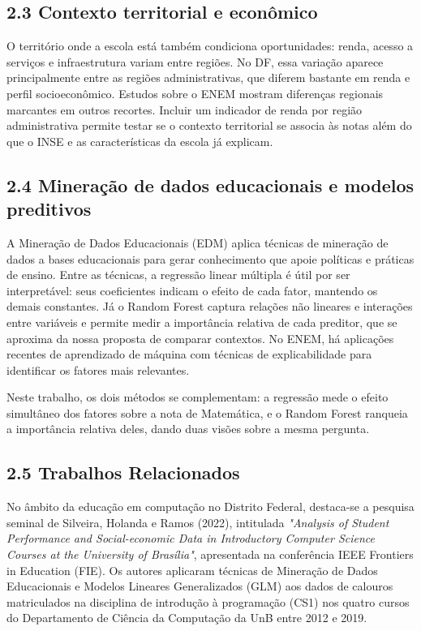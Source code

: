 \documentclass[twocolumn,10pt,a4paper]{article}
\begin{document}
\subsection*{2.3 Contexto territorial e econômico}

O território onde a escola está também condiciona oportunidades: renda, acesso a serviços e infraestrutura variam entre regiões. No DF, essa variação aparece principalmente entre as regiões administrativas, que diferem bastante em renda e perfil socioeconômico. Estudos sobre o ENEM mostram diferenças regionais marcantes em outros recortes. Incluir um indicador de renda por região administrativa permite testar se o contexto territorial se associa às notas além do que o INSE e as características da escola já explicam.

\subsection*{2.4 Mineração de dados educacionais e modelos preditivos}

A Mineração de Dados Educacionais (EDM) aplica técnicas de mineração de dados a bases educacionais para gerar conhecimento que apoie políticas e práticas de ensino. Entre as técnicas, a regressão linear múltipla é útil por ser interpretável: seus coeficientes indicam o efeito de cada fator, mantendo os demais constantes. Já o Random Forest captura relações não lineares e interações entre variáveis e permite medir a importância relativa de cada preditor, que se aproxima da nossa proposta de comparar contextos. No ENEM, há aplicações recentes de aprendizado de máquina com técnicas de explicabilidade para identificar os fatores mais relevantes.

Neste trabalho, os dois métodos se complementam: a regressão mede o efeito simultâneo dos fatores sobre a nota de Matemática, e o Random Forest ranqueia a importância relativa deles, dando duas visões sobre a mesma pergunta.

\subsection*{2.5 Trabalhos Relacionados}

No âmbito da educação em computação no Distrito Federal, destaca-se a pesquisa seminal de Silveira, Holanda e Ramos (2022), intitulada \textit{"Analysis of Student Performance and Social-economic Data in Introductory Computer Science Courses at the University of Brasília"}, apresentada na conferência IEEE Frontiers in Education (FIE). Os autores aplicaram técnicas de Mineração de Dados Educacionais e Modelos Lineares Generalizados (GLM) aos dados de calouros matriculados na disciplina de introdução à programação (CS1) nos quatro cursos do Departamento de Ciência da Computação da UnB entre 2012 e 2019.
\end{document}
